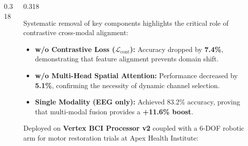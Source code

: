 \documentclass[final]{beamer}
\begin{document}
\begin{frame}[t]
\begin{columns}[t]
\begin{column}{0.318\textwidth}
  \end{column}

  \begin{column}{0.318\textwidth}

    \begin{tcolorbox}[posterbox, title={\faMicroscope{} 6. Ablation Study \& Insights}]
      Systematic removal of key components highlights the critical role of contrastive cross-modal alignment:
      
      \begin{itemize}
        \item \textbf{w/o Contrastive Loss ($\mathcal{L}_{\text{cont}}$):} Accuracy dropped by \textbf{7.4\%}, demonstrating that feature alignment prevents domain shift.
        \item \textbf{w/o Multi-Head Spatial Attention:} Performance decreased by \textbf{5.1\%}, confirming the necessity of dynamic channel selection.
        \item \textbf{Single Modality (EEG only):} Achieved 83.2\% accuracy, proving that multi-modal fusion provides a \textbf{+11.6\% boost}.
      \end{itemize}
    \end{tcolorbox}

    \vspace{10pt}

    \begin{tcolorbox}[posterbox, title={\faHospital{} 7. Real-Time Hardware Integration}]
      Deployed on \textbf{Vertex BCI Processor v2} coupled with a 6-DOF robotic arm for motor restoration trials at Apex Health Institute:
      

\end{tcolorbox}
\end{column}
\end{columns}
\end{frame}
\end{document}
